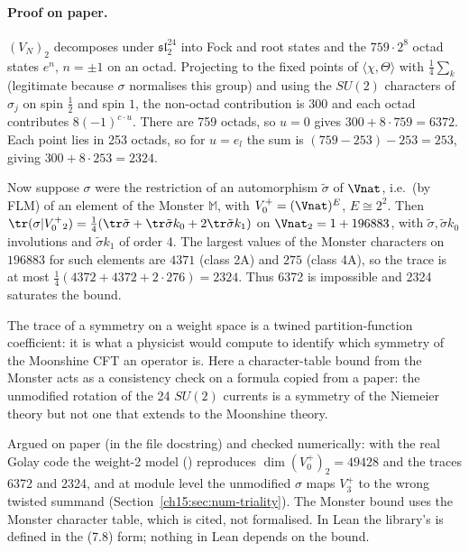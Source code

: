 \paragraph{Proof on paper.} $(V_N)_2$ decomposes under $\mathfrak{sl}_2^{24}$ into Fock and root
states and the $759\cdot2^8$ octad states $e^{n}$, $n=\pm1$ on an octad. Projecting to the fixed
points of $\langle\chi,\Theta\rangle$ with $\tfrac14\sum_{k}$ (legitimate because $\sigma$ normalises
this group) and using the $SU(2)$ characters of $\sigma_j$ on spin $\frac12$ and spin $1$, the
non-octad contribution is $300$ and each octad contributes $8(-1)^{c\cdot u}$. There are 759 octads,
so $u=0$ gives $300+8\cdot759=6372$. Each point lies in 253 octads, so for $u=e_l$ the sum is
$(759-253)-253=253$, giving $300+8\cdot253=2324$.

Now suppose $\sigma$ were the restriction of an automorphism $\tilde\sigma$ of $\Vnat$, i.e.\ (by
FLM) of an element of the Monster $\mathbb M$, with $V_0^+=(\Vnat)^E$, $E\cong2^2$. Then
$\tr(\sigma|V_0^+{}_2)=\frac14(\tr\tilde\sigma+\tr\tilde\sigma k_0+2\tr\tilde\sigma k_1)$ on
$\Vnat_2=1+196883$, with $\tilde\sigma,\tilde\sigma k_0$ involutions and $\tilde\sigma k_1$ of order
4. The largest values of the Monster characters on $196883$ for such elements are $4371$ (class 2A)
and $275$ (class 4A), so the trace is at most $\frac14(4372+4372+2\cdot276)=2324$. Thus 6372 is
impossible and 2324 saturates the bound.

\begin{physics}
The trace of a symmetry on a weight space is a twined partition-function coefficient: it is what
a physicist would compute to identify which symmetry of the Moonshine CFT an operator is. Here a
character-table bound from the Monster acts as a consistency check on a formula copied from a
paper: the unmodified rotation of the 24 $SU(2)$ currents is a symmetry of the Niemeier theory but
not one that extends to the Moonshine theory.
\end{physics}

\begin{status}
Argued on paper (in the file docstring) and checked numerically: with the real Golay code the
weight-2 model () reproduces $\dim(V_0^+)_2=49428$ and
the traces 6372 and 2324, and at module level the unmodified $\sigma$ maps $V_3^+$ to the wrong
twisted summand (Section~\ref{ch15:sec:num-triality}). The Monster bound uses the Monster character
table, which is cited, not formalised. In Lean the library's  is defined in the
(7.8) form; nothing in Lean depends on the bound.
\end{status}

